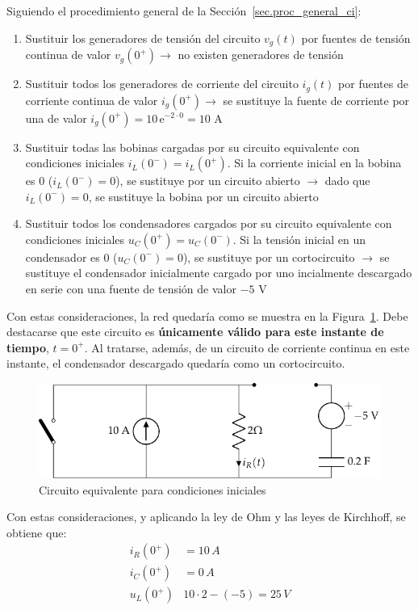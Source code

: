 \documentclass[11pt]{book} %
\begin{document}
\begin{example}
Siguiendo el procedimiento general de la Sección~\ref{sec.proc_general_ci}:
\begin{enumerate}
		\item Sustituir los generadores de tensión del circuito $v_g(t)$ por fuentes de tensión continua de valor $v_g(0^+)\rightarrow$ no existen generadores de tensión
		\item Sustituir todos los generadores de corriente del circuito $i_g(t)$ por fuentes de corriente continua de valor $i_g(0^+)\rightarrow$ se sustituye la fuente de corriente por una de valor $i_g(0^+)=10\,\mathrm{e}^{-2\cdot 0}=10$ A
		\item Sustituir todas las bobinas cargadas por su circuito equivalente con condiciones iniciales $i_L(0^-)=i_L(0^+)$. Si la corriente inicial en la bobina es 0 ($i_L(0^-)=0$), se sustituye por un circuito abierto $\rightarrow$ dado que $i_L(0^-)=0$, se sustituye la bobina por un circuito abierto
		\item Sustituir todos los condensadores cargados por su circuito equivalente con condiciones iniciales $u_C(0^+)=u_C(0^-)$. Si la tensión inicial en un condensador es 0 ($u_C(0^-)=0$), se sustituye por un cortocircuito $\rightarrow$ se sustituye el condensador inicialmente cargado por uno incialmente descargado en serie con una fuente de tensión de valor $-5$ V
	\end{enumerate}
	Con estas consideraciones, la red quedaría como se muestra en la Figura~\ref{fig.ej_cond_iniciales_0+}. Debe destacarse que este circuito es \textbf{únicamente válido para este instante de tiempo}, $t=0^+$. Al tratarse, además, de un circuito de corriente continua en este instante, el condensador descargado quedaría como un cortocircuito.  
	\begin{figure}[H]
	    \centering
	    \includegraphics{../figs/ej_cond_iniciales_0+.pdf}
	    \caption{Circuito equivalente para condiciones iniciales}
	    \label{fig.ej_cond_iniciales_0+}
	\end{figure}
	
	Con estas consideraciones, y aplicando la ley de Ohm y las leyes de Kirchhoff, se obtiene que:
	\begin{align*}
	    i_R(0^+)&=10\,A\\
	    i_C(0^+)&=0\,A\\
	    u_L(0^+)&10\cdot 2 - (-5)=25\,V
	\end{align*}
	
	\end{example}
\end{document}
